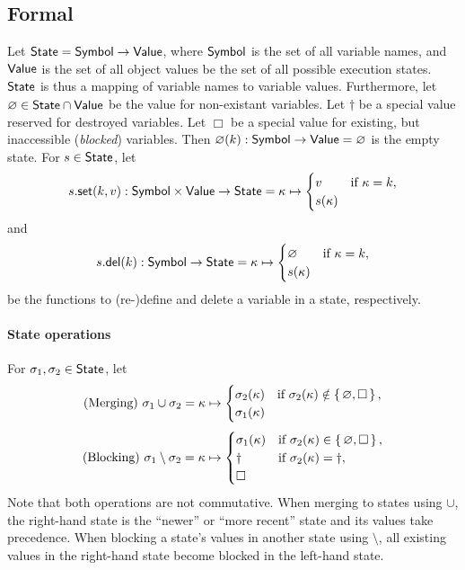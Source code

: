 \subsection{Formal}

Let $\mathsf{State} = \mathsf{Symbol} \to \mathsf{Value}$, where $\mathsf{Symbol}$ is the set of all variable names, and $\mathsf{Value}$ is the set of all object values be the set of all possible execution states.
$\mathsf{State}$ is thus a mapping of variable names to variable values.
Furthermore, let $\varnothing \in \mathsf{State} \cap \mathsf{Value}$ be the value for non-existant variables.
Let $\dagger$ be a special value reserved for destroyed variables.
Let $\Box$ be a special value for existing, but inaccessible (\emph{blocked}) variables.
Then $\varnothing(k): \mathsf{Symbol} \to \mathsf{Value} = \varnothing$ is the empty state.
For $s \in \mathsf{State}$, let
$$
s.\mathsf{set}(k, v): \mathsf{Symbol} \times \mathsf{Value} \to \mathsf{State} =
	\kappa \mapsto \begin{cases}
		v & \text{if } \kappa = k,\\
		s(\kappa)
\end{cases}$$
and
$$
s.\mathsf{del}(k): \mathsf{Symbol} \to \mathsf{State} = \kappa \mapsto \begin{cases}
	\varnothing & \text{if } \kappa = k,\\
	s(\kappa)
\end{cases}
$$
be the functions to (re-)define and delete a variable in a state, respectively.

\paragraph{State operations}
For $\sigma_1, \sigma_2 \in \mathsf{State}$, let
$$\text{(Merging) }
	\sigma_1 \cup \sigma_2 =
		\kappa \mapsto \begin{cases}
			\sigma_2(\kappa) &\text{if } \sigma_2(\kappa) \notin \left\{\,\varnothing, \Box\,\right\},\\
			\sigma_1(\kappa)
		\end{cases}
$$
$$\text{(Blocking) }
	\sigma_1 \setminus \sigma_2 =
		\kappa \mapsto \begin{cases}
			\sigma_1(\kappa) &\text{if } \sigma_2(\kappa) \in \left\{\,\varnothing, \Box\,\right\},\\
			\dagger &\text{if } \sigma_2(\kappa) = \dagger,\\
			\Box
		\end{cases}
$$
Note that both operations are not commutative.
When merging to states using $\cup$, the right-hand state is the ``newer'' or ``more recent'' state and its values take precedence.
When blocking a state's values in another state using $\setminus$, all existing values in the right-hand state become blocked in the left-hand state.


